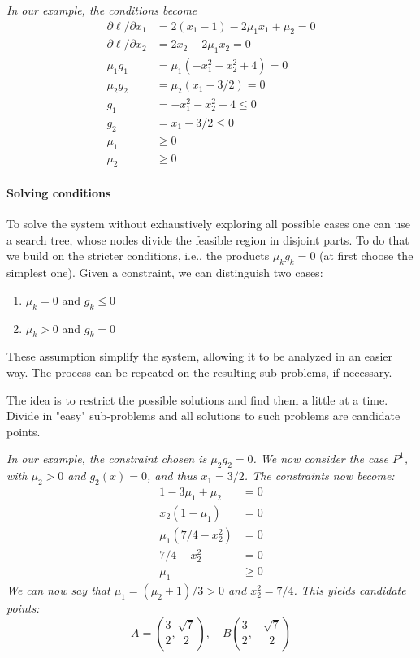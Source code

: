 \textit{In our example, the conditions become}
\begin{align*}
	\partial \ell / \partial x_1 & = 2(x_1 - 1) - 2 \mu_1 x_1 + \mu_2 = 0 \\
	\partial \ell / \partial x_2 & = 2x_2 - 2 \mu_1 x_2 = 0 \\
	\mu_1 g_1 & = \mu_1(-x_1^2 -x_2^2 + 4) = 0 \\
	\mu_2 g_2 & = \mu_2 (x_1 - 3/2) = 0 \\
	g_1 & = -x_1^2 -x_2^2 + 4 \leq 0 \\
	g_2 & = x_1 - 3/2 \leq 0 \\
	\mu_1 & \geq 0 \\
	\mu_2 & \geq 0
\end{align*}

\paragraph{Solving conditions} To solve the system without exhaustively exploring all possible cases one can use a search tree, whose nodes divide the feasible region in disjoint parts. To do that we build on the stricter conditions, i.e., the products $\mu_k g_k = 0$ (at first choose the simplest one). Given a constraint, we can distinguish two cases:
\begin{enumerate}
	\item $\mu_k = 0$ and $g_k \leq 0$
	
	\item $\mu_k > 0$ and $g_k = 0$
\end{enumerate}

These assumption simplify the system, allowing it to be analyzed in an easier way. The process can be repeated on the resulting sub-problems, if necessary.

The idea is to restrict the possible solutions and find them a little at a time. Divide in "easy" sub-problems and all solutions to such problems are candidate points.

\textit{In our example, the constraint chosen is $\mu_2 g_2 = 0$. We now consider the case $P^1$, with $\mu_2 > 0$ and $g_2 (x) = 0$, and thus $x_1 = 3/2$. The constraints now become:
\begin{align*}
	1 - 3 \mu_1 + \mu_2 & = 0 \\
	x_2 (1 - \mu_1) & = 0 \\
	\mu_1 (7/4 - x_2^2) & = 0 \\
	7/4 - x_2^2 & = 0 \\
	\mu_1 & \geq 0
\end{align*}
We can now say that $\mu_1 = (\mu_2 + 1)/3 > 0$ and $x_2^2 = 7/4$. This yields candidate points:
$$ A = \left(\frac{3}{2}, \frac{\sqrt{7}}{2}\right), \quad B \left(\frac{3}{2}, - \frac{\sqrt{7}}{2}\right) $$
}

